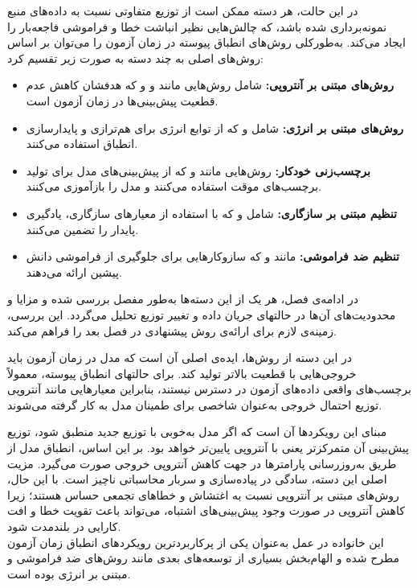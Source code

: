 در این حالت، هر دسته‌ ممکن است از توزیع متفاوتی نسبت به داده‌های منبع نمونه‌برداری شده باشد، که چالش‌هایی نظیر انباشت خطا و فراموشی فاجعه‌بار را ایجاد می‌کند. به‌طور‌کلی روش‌های انطباق پیوسته در زمان آزمون را می‌توان بر اساس روش‌های اصلی به چند دسته به صورت زیر تقسیم کرد:

\begin{itemize}
	\item {\textbf{روش‌های مبتنی بر آنتروپی:}} شامل روش‌هایی مانند \cite{TENT} و \cite{sar} و \cite{deyo} که هدفشان کاهش عدم قطعیت پیش‌بینی‌ها در زمان آزمون است.
	\item {\textbf{روش‌های مبتنی بر انرژی:}} شامل \cite{tea} و \cite{aea} که از توابع انرژی برای هم‌ترازی و پایدارسازی انطباق استفاده می‌کنند.
	\item {\textbf{برچسب‌زنی خودکار:}} روش‌هایی مانند \cite{t3a} و \cite{shot} که از پیش‌بینی‌های مدل برای تولید برچسب‌های موقت استفاده می‌کنند و مدل را بازآموزی می‌کنند.
	\item {\textbf{تنظیم مبتنی بر سازگاری:}} شامل \cite{rem} و \cite{petal} که با استفاده از معیارهای سازگاری، یادگیری پایدار را تضمین می‌کنند.
	\item {\textbf{تنظیم ضد فراموشی:}} مانند \cite{cotta} و \cite{eata} که سازوکارهایی برای جلوگیری از فراموشی دانش پیشین ارائه می‌دهند.
\end{itemize}

در ادامه‌ی فصل، هر یک از این دسته‌ها به‌طور مفصل بررسی شده و مزایا و محدودیت‌های آن‌ها در حالتهای جریان داده و تغییر توزیع تحلیل می‌گردد. این بررسی، زمینه‌ی لازم برای ارائه‌ی روش پیشنهادی در فصل بعد را فراهم می‌کند.


در این دسته از روش‌ها، ایده‌ی اصلی آن است که مدل در زمان آزمون باید خروجی‌هایی با قطعیت بالاتر تولید کند. 
برای حالتهای انطباق پیوسته، معمولاً برچسب‌های واقعی داده‌های آزمون در دسترس نیستند، 
بنابراین معیارهایی مانند آنتروپی توزیع احتمال خروجی به‌عنوان شاخصی برای طمینان مدل به کار گرفته می‌شوند. 

مبنای این رویکردها آن است که اگر مدل به‌خوبی با توزیع جدید منطبق شود، توزیع پیش‌بینی آن متمرکزتر یعنی با آنتروپی پایین‌تر خواهد بود. 
بر این اساس، انطباق مدل از طریق به‌روزرسانی پارامترها در جهت کاهش آنتروپی خروجی صورت می‌گیرد. 
مزیت اصلی این دسته، سادگی در پیاده‌سازی و سربار محاسباتی ناچیز است. 
با این حال، روش‌های مبتنی بر آنتروپی نسبت به {اغتشاش‌} و خطاهای تجمعی حساس هستند؛ زیرا کاهش آنتروپی در صورت وجود پیش‌بینی‌های اشتباه، 
می‌تواند باعث تقویت خطا و افت کارایی در بلندمدت شود. \\
این خانواده در عمل به‌عنوان یکی از پرکاربردترین رویکردهای انطباق زمان آزمون مطرح شده 
و الهام‌بخش بسیاری از توسعه‌های بعدی مانند روش‌های ضد فراموشی و مبتنی بر انرژی بوده است.


